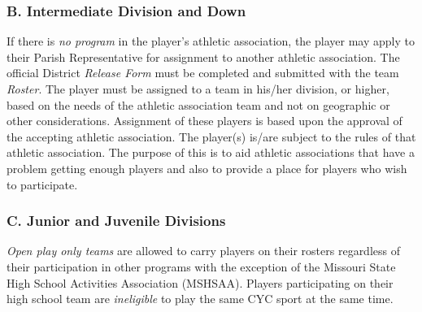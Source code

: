 \subsubsection{B. Intermediate Division and Down}
If there is {\em no program} in the player's athletic association, the player may apply to their Parish Representative for assignment to another athletic association. The official District {\em Release Form} must be completed and submitted with the team {\em Roster}. The player must be assigned to a team in his/her division, or higher, based on the needs of the athletic association team and not on geographic or other considerations.  Assignment of these players is based upon the approval of the accepting athletic association.  The player(s) is/are subject to the rules of that athletic association. The purpose of this is to aid athletic associations that have a problem getting enough players and also to provide a place for players who wish to participate.

\subsubsection{C. Junior and Juvenile Divisions}
{\em Open play only teams} are allowed to carry players on their rosters regardless of their participation in other programs with the exception of the Missouri State High School Activities Association (MSHSAA).  Players participating on their high school team are {\em ineligible} to play the same CYC sport at the same time.

